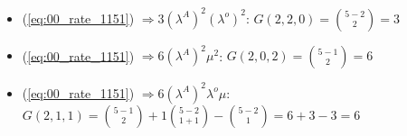 \begin{multicols}{2}
\begin{itemize}
        \item (\ref{eq:00_rate_1151}) \( \Rightarrow 3 (\lambda^A)^2 (\lambda^o)^2 \): \(G(2,2,0) = \binom{5-2}{2} = 3\)
        \item (\ref{eq:00_rate_1151}) \( \Rightarrow 6 (\lambda^A)^2 \mu ^ 2\): \(G(2,0,2) = \binom{5-1}{2} = 6\)
    \end{itemize}
\end{multicols}

\begin{itemize}
    \item (\ref{eq:00_rate_1151}) \( \Rightarrow 6 (\lambda^A)^2 \lambda^o \mu\): \(G(2,1,1) = \binom{5-1}{2} + 1\binom{5-2}{1+1} - \binom{5-2}{1} = 6 + 3 - 3 = 6\)
\end{itemize}

